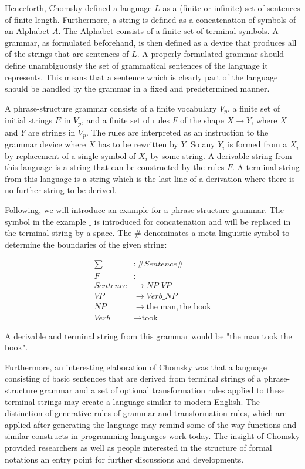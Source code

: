 \documentclass{article}
\begin{document}
Henceforth, Chomsky defined a language $L$ as a (finite or infinite) set of sentences of finite length. Furthermore, a string is defined as a concatenation of symbols of an Alphabet $A$. The Alphabet consists of a finite set of terminal symbols. A grammar, as formulated beforehand, is then defined as a device that produces all of the strings that are sentences of $L$. A properly formulated grammar should define unambiguously the set of grammatical sentences of the language it represents. This means that a sentence which is clearly part of the language should be handled by the grammar in a fixed and predetermined manner.

A phrase-structure grammar consists of a finite vocabulary $V_p$, a finite set of initial strings $E$ in $V_p$, and a finite set of rules $F$ of the shape $X \to Y$, where $X$ and $Y$ are strings in $V_p$. The rules are interpreted as an instruction to the grammar device where $X$ has to be rewritten by $Y$. So any $Y_i$ is formed from a $X_i$ by replacement of a single symbol of $X_i$ by some string. A derivable string from this language is a string that can be constructed by the rules $F$. A terminal string from this language is a string which is the last line of a derivation where there is no further string to be derived.

Following, we will introduce an example for a phrase structure grammar. The symbol in the example $\_$ is introduced for concatenation and will be replaced in the terminal string by a space. The \# denominates a meta-linguistic symbol to determine the boundaries of the given string:

\begin{equation} \label{eq1}
	\begin{split}
		\sum &: \# Sentence \# \\
		F&: \\ Sentence &\to NP\_VP \\
		VP &\to Verb\_NP \\
		NP &\to \text{the man}, \text{the book} \\
		Verb &\to \text{took}
	\end{split}
\end{equation}

A derivable and terminal string from this grammar would be "the man took the book".

Furthermore, an interesting elaboration of Chomsky was that a language consisting of basic sentences that are derived from terminal strings of a phrase-structure grammar and a set of optional transformation rules applied to these terminal strings may create a language similar to modern English. The distinction of generative rules of grammar and transformation rules, which are applied after generating the language may remind some of the way functions and similar constructs in programming languages work today. The insight of Chomsky provided researchers as well as people interested in the structure of formal notations an entry point for further discussions and developments.
\end{document}
